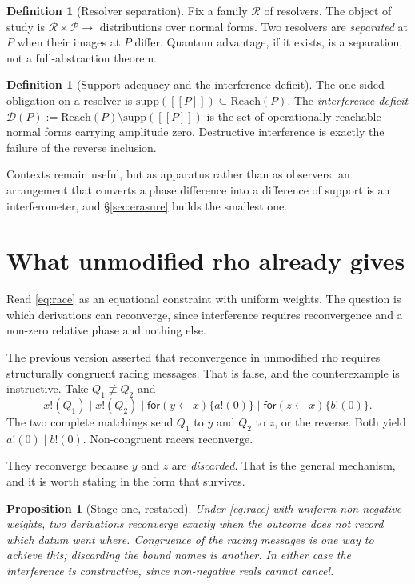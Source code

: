 \documentclass[11pt,a4paper]{article}
\theoremstyle{plain}
\newtheorem{proposition}[theorem]{Proposition}
\theoremstyle{definition}
\newtheorem{definition}[theorem]{Definition}
\theoremstyle{remark}
\newcommand{\sem}[1]{[\![#1]\!]}
\newcommand{\Proc}{\mathcal{P}}
\newcommand{\Reach}{\mathrm{Reach}}
\newcommand{\supp}{\mathrm{supp}}
\newcommand{\scong}{\equiv}
\begin{document}
\begin{definition}[Resolver separation]\label{def:sep}
Fix a family $\mathcal{R}$ of resolvers. The object of study is
$\mathcal{R} \times \Proc \to$ distributions over normal forms. Two resolvers
are \emph{separated} at $P$ when their images at $P$ differ. Quantum advantage,
if it exists, is a separation, not a full-abstraction theorem.
\end{definition}

\begin{definition}[Support adequacy and the interference
deficit]\label{def:deficit}
The one-sided obligation on a resolver is
$\supp(\sem{P}) \subseteq \Reach(P)$. The \emph{interference deficit}
$\mathcal{D}(P) := \Reach(P) \setminus \supp(\sem{P})$ is the set of
operationally reachable normal forms carrying amplitude zero. Destructive
interference is exactly the failure of the reverse inclusion.
\end{definition}

Contexts remain useful, but as apparatus rather than as observers: an
arrangement that converts a phase difference into a difference of support is an
interferometer, and \S\ref{sec:erasure} builds the smallest one.

\section{What unmodified rho already gives}\label{sec:stage1}

Read \eqref{eq:race} as an equational constraint with uniform weights. The
question is which derivations can reconverge, since interference requires
reconvergence and a non-zero relative phase and nothing else.

The previous version asserted that reconvergence in unmodified rho requires
structurally congruent racing messages. That is false, and the counterexample is
instructive. Take $Q_1 \not\scong Q_2$ and
\[
  x!(Q_1) \mid x!(Q_2)
  \mid \textsf{for}(y \leftarrow x)\{a!(0)\}
  \mid \textsf{for}(z \leftarrow x)\{b!(0)\} .
\]
The two complete matchings send $Q_1$ to $y$ and $Q_2$ to $z$, or the reverse.
Both yield $a!(0) \mid b!(0)$. Non-congruent racers reconverge.

They reconverge because $y$ and $z$ are \emph{discarded}. That is the general
mechanism, and it is worth stating in the form that survives.

\begin{proposition}[Stage one, restated]\label{prop:stage1}
Under \eqref{eq:race} with uniform non-negative weights, two derivations
reconverge exactly when the outcome does not record which datum went where.
Congruence of the racing messages is one way to achieve this; discarding the
bound names is another. In either case the interference is constructive, since
non-negative reals cannot cancel.
\end{proposition}
\end{document}
